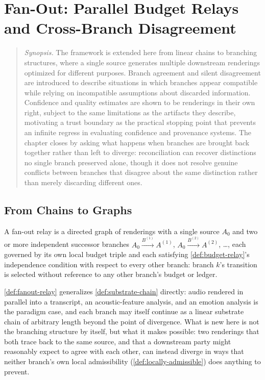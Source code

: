 \chapter{Fan-Out: Parallel Budget Relays and Cross-Branch Disagreement}
\label{ch:fanout}

\begin{quotation}
\noindent\textit{Synopsis.} The framework is extended here from linear
chains to branching structures, where a single source generates multiple
downstream renderings optimized for different purposes. Branch agreement
and silent disagreement are introduced to describe situations in which
branches appear compatible while relying on incompatible assumptions about
discarded information. Confidence and quality estimates are shown to be
renderings in their own right, subject to the same limitations as the
artifacts they describe, motivating a trust boundary as the practical
stopping point that prevents an infinite regress in evaluating confidence
and provenance systems. The chapter closes by asking what happens when
branches are brought back together rather than left to diverge:
reconciliation can recover distinctions no single branch preserved alone,
though it does not resolve genuine conflicts between branches that
disagree about the same distinction rather than merely discarding
different ones.
\end{quotation}

\section{From Chains to Graphs}

\begin{definition}
\label{def:fanout-relay}
A fan-out relay is a directed graph of renderings with a single source
$A_0$ and two or more independent successor branches
$A_0 \xrightarrow{B^{(1)}} A^{(1)}$, $A_0 \xrightarrow{B^{(2)}} A^{(2)}$,
\ldots, each governed by its own local budget triple and each satisfying
\cref{def:budget-relay}'s independence condition with respect to every
other branch: branch $k$'s transition is selected without reference to
any other branch's budget or ledger.
\end{definition}

\cref{def:fanout-relay} generalizes \cref{def:substrate-chain} directly:
audio rendered in parallel into a transcript, an acoustic-feature
analysis, and an emotion analysis is the paradigm case, and each branch
may itself continue as a linear substrate chain of arbitrary length
beyond the point of divergence. What is new here is not the branching
structure by itself, but what it makes possible: two renderings that
both trace back to the same source, and that a downstream party might
reasonably expect to agree with each other, can instead diverge in ways
that neither branch's own local admissibility (\cref{def:locally-admissible})
does anything to prevent.

